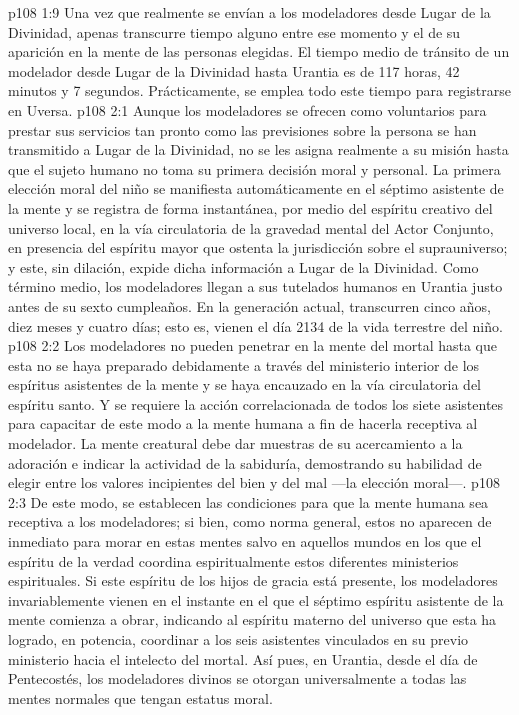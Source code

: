 \vs p108 1:9 Una vez que realmente se envían a los modeladores desde Lugar de la Divinidad, apenas transcurre tiempo alguno entre ese momento y el de su aparición en la mente de las personas elegidas. El tiempo medio de tránsito de un modelador desde Lugar de la Divinidad hasta Urantia es de 117 horas, 42 minutos y 7 segundos. Prácticamente, se emplea todo este tiempo para registrarse en Uversa.
\vs p108 2:1 Aunque los modeladores se ofrecen como voluntarios para prestar sus servicios tan pronto como las previsiones sobre la persona se han transmitido a Lugar de la Divinidad, no se les asigna realmente a su misión hasta que el sujeto humano no toma su primera decisión moral y personal. La primera elección moral del niño se manifiesta automáticamente en el séptimo asistente de la mente y se registra de forma instantánea, por medio del espíritu creativo del universo local, en la vía circulatoria de la gravedad mental del Actor Conjunto, en presencia del espíritu mayor que ostenta la jurisdicción sobre el suprauniverso; y este, sin dilación, expide dicha información a Lugar de la Divinidad. Como término medio, los modeladores llegan a sus tutelados humanos en Urantia justo antes de su sexto cumpleaños. En la generación actual, transcurren cinco años, diez meses y cuatro días; esto es, vienen el día 2134 de la vida terrestre del niño.
\vs p108 2:2 \pc Los modeladores no pueden penetrar en la mente del mortal hasta que esta no se haya preparado debidamente a través del ministerio interior de los espíritus asistentes de la mente y se haya encauzado en la vía circulatoria del espíritu santo. Y se requiere la acción correlacionada de todos los siete asistentes para capacitar de este modo a la mente humana a fin de hacerla receptiva al modelador. La mente creatural debe dar muestras de su acercamiento a la adoración e indicar la actividad de la sabiduría, demostrando su habilidad de elegir entre los valores incipientes del bien y del mal ---la elección moral---.
\vs p108 2:3 De este modo, se establecen las condiciones para que la mente humana sea receptiva a los modeladores; si bien, como norma general, estos no aparecen de inmediato para morar en estas mentes salvo en aquellos mundos en los que el espíritu de la verdad coordina espiritualmente estos diferentes ministerios espirituales. Si este espíritu de los hijos de gracia está presente, los modeladores invariablemente vienen en el instante en el que el séptimo espíritu asistente de la mente comienza a obrar, indicando al espíritu materno del universo que esta ha logrado, en potencia, coordinar a los seis asistentes vinculados en su previo ministerio hacia el intelecto del mortal. Así pues, en Urantia, desde el día de Pentecostés, los modeladores divinos se otorgan universalmente a todas las mentes normales que tengan estatus moral.
